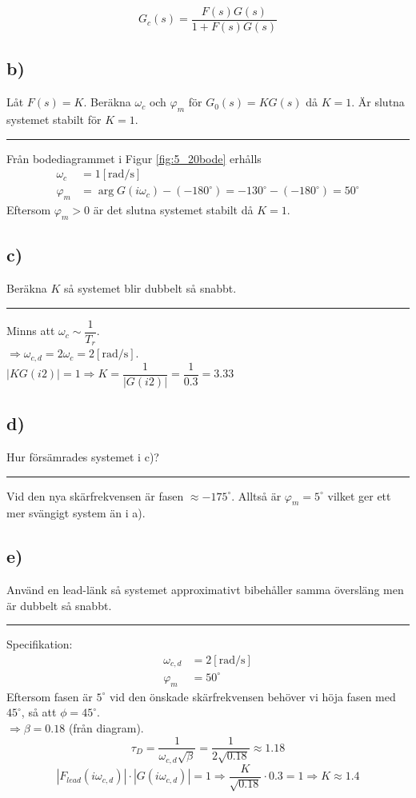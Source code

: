 \documentclass[12pt]{article}
\newcommand{\qline}{\hrule \vspace*{10pt}}
\begin{document}
\[G_c(s) = \frac{F(s)G(s)}{1+F(s)G(s)}\]

\subsection*{b)}
Låt $F(s) = K$. Beräkna $\omega_c$ och $\varphi_m$ för $G_0(s) = KG(s)$ då $K = 1$. Är slutna systemet stabilt för $K = 1$.\vspace*{5pt}
\qline
Från bodediagrammet i Figur \ref{fig:5_20bode} erhålls
\begin{align*}
  \omega_c &= 1 [\mathrm{rad/s}] \\
  \varphi_m &= \arg{G(i\omega_c)}-(-180^{\circ}) = -130^{\circ} - (-180^{\circ}) = 50^{\circ}
\end{align*}
Eftersom $\varphi_m > 0$ är det slutna systemet stabilt då $K = 1$.

\subsection*{c)}
Beräkna $K$ så systemet blir dubbelt så snabbt.
\qline
Minns att $\omega_c \sim \dfrac{1}{T_r}$. \\

$\Rightarrow \omega_{c,d} = 2\omega_c = 2 [\mathrm{rad/s}]$. \\

$|KG(i2)| = 1 \Rightarrow K = \dfrac{1}{|G(i2)|} = \dfrac{1}{0.3} = 3.33$

\subsection*{d)}
Hur försämrades systemet i c)?
\qline
Vid den nya skärfrekvensen är fasen $\approx -175^{\circ}$. Alltså är $\varphi_m = 5^{\circ}$ vilket ger ett mer svängigt system än i a).

\subsection*{e)}
Använd en lead-länk så systemet approximativt bibehåller samma översläng men är dubbelt så snabbt.
\vspace*{5pt}
\qline
Specifikation:
\begin{align*}
  \omega_{c,d} &= 2 [\mathrm{rad/s}] \\
  \varphi_m &= 50^{\circ}
\end{align*}
Eftersom fasen är $5^{\circ}$ vid den önskade skärfrekvensen behöver vi höja fasen med $45^{\circ}$, så att $\phi = 45^{\circ}$. \\
$\Rightarrow \beta = 0.18$ (från diagram). \\ 
\[\tau_D = \frac{1}{\omega_{c,d}\sqrt{\beta}} = \frac{1}{2\sqrt{0.18}} \approx 1.18\] 
\[|F_{lead}(i\omega_{c,d})| \cdot |G(i\omega_{c,d})| = 1 \Rightarrow \frac{K}{\sqrt{0.18}}\cdot 0.3 = 1 \Rightarrow K \approx 1.4 \]
\end{document}
